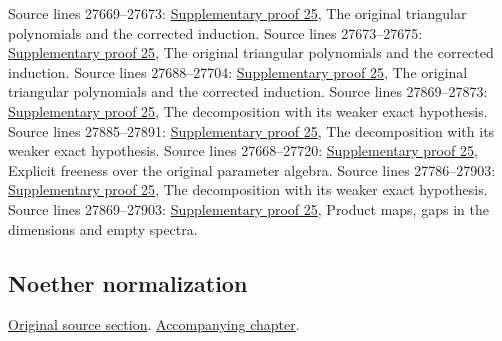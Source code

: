 \begin{AlgebraSourceRoutes}
 Source lines 27669--27673: \hyperlink{algebra_affine_dimension_notes_20260928}{Supplementary proof 25}, The original triangular polynomials and the corrected induction.
 Source lines 27673--27675: \hyperlink{algebra_affine_dimension_notes_20260928}{Supplementary proof 25}, The original triangular polynomials and the corrected induction.
 Source lines 27688--27704: \hyperlink{algebra_affine_dimension_notes_20260928}{Supplementary proof 25}, The original triangular polynomials and the corrected induction.
 Source lines 27869--27873: \hyperlink{algebra_affine_dimension_notes_20260928}{Supplementary proof 25}, The decomposition with its weaker exact hypothesis.
 Source lines 27885--27891: \hyperlink{algebra_affine_dimension_notes_20260928}{Supplementary proof 25}, The decomposition with its weaker exact hypothesis.
 Source lines 27668--27720: \hyperlink{algebra_affine_dimension_notes_20260928}{Supplementary proof 25}, Explicit freeness over the original parameter algebra.
 Source lines 27786--27903: \hyperlink{algebra_affine_dimension_notes_20260928}{Supplementary proof 25}, The decomposition with its weaker exact hypothesis.
 Source lines 27869--27903: \hyperlink{algebra_affine_dimension_notes_20260928}{Supplementary proof 25}, Product maps, gaps in the dimensions and empty spectra.
\end{AlgebraSourceRoutes}

\subsection{Noether normalization}
\hypertarget{algebra-source-section-Noether-normalization}{}
\noindent\href{https://github.com/stacks/stacks-project/blob/a04446e57ec1fbc252a871afcec7752fb2807b14/algebra.tex\#L27920}{Original source section}. \href{algebra.pdf\#nameddest=section-Noether-normalization}{Accompanying chapter}.


